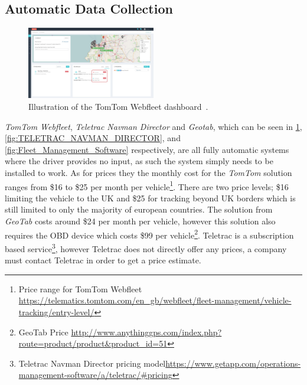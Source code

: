 \subsection{Automatic Data Collection}%
\begin{figure}[h!]
    \centering
    \includegraphics[width=0.5\textwidth]{img/tomtom_webfleet.jpeg}
	\caption{Illustration of the TomTom Webfleet dashboard~\cite{fuckemtomtom}.}
    \label{fig:TomTom_Webfleet}
\end{figure}
\textit{TomTom Webfleet}, \textit{Teletrac Navman Director} and \textit{Geotab}, which can be seen in \cref{fig:TomTom_Webfleet}, \cref{fig:TELETRAC_NAVMAN_DIRECTOR}, and \cref{fig:Fleet_Management_Software} respectively, are all fully automatic systems where the driver provides no input, as such the system simply needs to be installed to work.
As for prices they the monthly cost for the \textit{TomTom} solution ranges from \$16 to \$25 per month per vehicle\footnote{Price range for TomTom Webfleet\\ \url{https://telematics.tomtom.com/en_gb/webfleet/fleet-management/vehicle-tracking/entry-level/}}.
There are two price levels; \$16 limiting the vehicle to the UK and \$25 for tracking beyond UK borders which is still limited to only the majority of european countries.
The solution from \textit{GeoTab} costs around \$24 per month per vehicle, however this solution also requires the OBD device which costs \$99 per vehicle\footnote{GeoTab Price \url{http://www.anythinggps.com/index.php?route=product/product\&product_id=51}}.
Teletrac is a subscription based service\footnote{Teletrac Navman Director pricing model\url{https://www.getapp.com/operations-management-software/a/teletrac/\#pricing}}, however Teletrac does not directly offer any prices, a company must contact Teletrac in order to get a price estimate.

